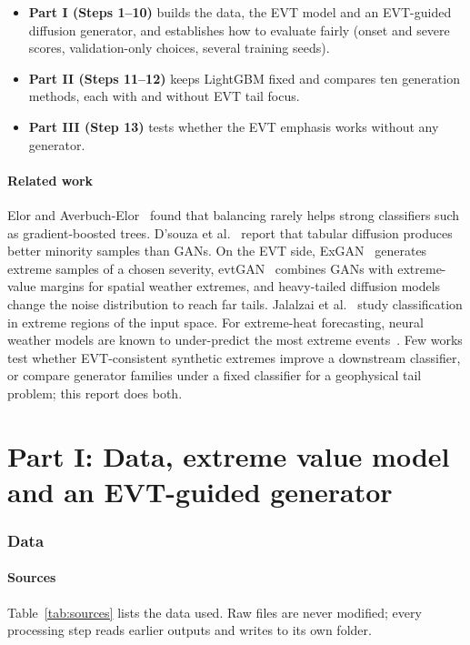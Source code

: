 \documentclass[11pt,a4paper]{article}
\begin{document}
\begin{itemize}
  \item \textbf{Part I (Steps 1--10)} builds the data, the EVT model and an EVT-guided diffusion generator,
        and establishes how to evaluate fairly (onset and severe scores, validation-only choices, several
        training seeds).
  \item \textbf{Part II (Steps 11--12)} keeps LightGBM fixed and compares ten generation methods, each with
        and without EVT tail focus.
  \item \textbf{Part III (Step 13)} tests whether the EVT emphasis works without any generator.
\end{itemize}

\subsection{Related work}
Elor and Averbuch-Elor~\cite{elor2022smote} found that balancing rarely helps strong classifiers such as
gradient-boosted trees. D'souza et al.~\cite{dsouza2025overlap} report that tabular diffusion produces
better minority samples than GANs. On the EVT side, ExGAN~\cite{bhatia2021exgan} generates extreme samples
of a chosen severity, evtGAN~\cite{boulaguiem2022evtgan} combines GANs with extreme-value margins for
spatial weather extremes, and heavy-tailed diffusion models~\cite{pandey2025heavy} change the noise
distribution to reach far tails. Jalalzai et al.~\cite{jalalzai2018extreme} study classification in
extreme regions of the input space. For extreme-heat forecasting, neural weather models are known to
under-predict the most extreme events~\cite{lopezgomez2023heat}. Few works test whether EVT-consistent
synthetic extremes improve a downstream classifier, or compare generator families under a fixed
classifier for a geophysical tail problem; this report does both.

\part*{Part I: Data, extreme value model and an EVT-guided generator}

\section{Data}
\subsection{Sources}
Table~\ref{tab:sources} lists the data used. Raw files are never modified; every processing step reads
earlier outputs and writes to its own folder.
\end{document}
